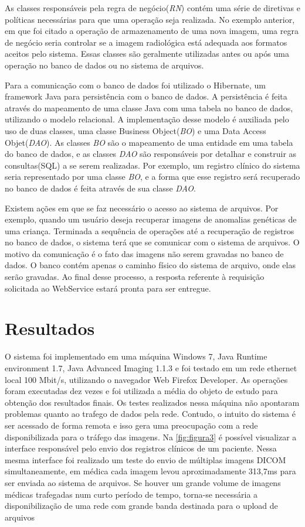 As classes responsáveis pela regra de negócio(\textit{RN}) contém uma série de diretivas e políticas necessárias para que uma operação seja realizada.
No exemplo anterior, em que foi citado a operação de armazenamento de uma nova imagem, uma regra de negócio seria controlar se a imagem radiológica está adequada aos formatos aceitos pelo sistema.
Essas classes são geralmente utilizadas antes ou após uma operação no banco de dados ou no sistema de arquivos.

Para a comunicação com o banco de dados foi utilizado o Hibernate, um framework Java para persistência com o banco de dados.
A persistência é feita através do mapeamento de uma classe Java com uma tabela no banco de dados, utilizando o modelo relacional.
A implementação desse modelo é auxiliada pelo uso de duas classes, uma classe Business Object(\textit{BO}) e uma Data Access Objet(\textit{DAO}).
As classes \textit{BO} são o mapeamento de uma entidade em uma tabela do banco de dados, e as classes \textit{DAO} são responsáveis por detalhar e construir as consultas(SQL) a se serem realizadas.
Por exemplo, um registro clínico do sistema seria representado por uma classe \textit{BO}, e a forma que esse registro será recuperado no banco de dados é feita através de sua classe \textit{DAO}.

Existem ações em que se faz necessário o acesso ao sistema de arquivos.
Por exemplo, quando um usuário deseja recuperar imagens de anomalias genéticas de uma criança.
Terminada a sequência de operações até a recuperação de registros no banco de dados, o sistema terá que se comunicar com o sistema de arquivos.
O motivo da comunicação é o fato das imagens não serem gravadas no banco de dados. O banco contém apenas o caminho físico do sistema de arquivo, onde elas serão gravadas.
Ao final desse processo, a resposta referente à requisição solicitada ao WebService estará pronta para ser entregue.

\section{\esp Resultados}

O sistema foi implementado em uma máquina Windows 7, Java Runtime environment 1.7, Java Advanced Imaging 1.1.3 e foi testado em um rede ethernet local 100 Mbit/s, utilizando o navegador Web Firefox Developer. As operações foram executadas dez vezes e foi utilizada a média do objeto de estudo para obtenção dos resultados finais. Os testes realizados nessa máquina não apontaram problemas quanto ao trafego de dados pela rede. Contudo, o intuito do sistema é ser acessado de forma remota e isso gera uma preocupação com a rede disponibilizada para o tráfego das imagens. Na \ref{fig:figura3} é possível visualizar a interface responsável pelo envio dos registros clínicos de um paciente. Nessa mesma interface foi realizado um teste do envio de múltiplas imagens DICOM simultaneamente, em médica cada imagem levou aproximadamente 313,7ms para ser enviada ao sistema de arquivos. Se houver um grande volume de imagens médicas trafegadas num curto período de tempo, torna-se necessária a disponibilização de uma rede com grande banda destinada para o upload de arquivos

